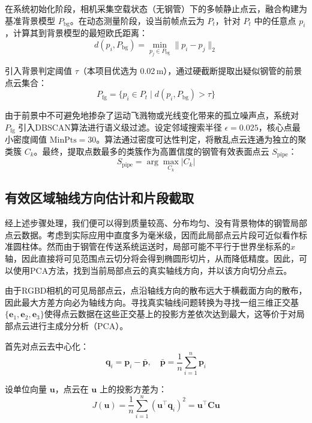 \documentclass{article}
\let\oldcite\cite
\renewcommand{\cite}[1]{\oldcite{#1}}
\begin{document}
在系统初始化阶段，相机采集空载状态（无钢管）下的多帧静止点云，融合构建为基准背景模型 $P_{\text{bg}}$。在动态测量阶段，设当前帧点云为 $P_t$，针对 $P_t$ 中的任意点 $p_i$，计算其到背景模型的最短欧氏距离：
\begin{equation}
    d(p_i, P_{\text{bg}}) = \min_{p_j \in P_{\text{bg}}} \| p_i - p_j \|_2
\end{equation}

引入背景判定阈值 $\tau$（本项目优选为 0.02\,m），通过硬截断提取出疑似钢管的前景点云集合：
\begin{equation}
    P_{\text{fg}} = \{ p_i \in P_t \mid d(p_i, P_{\text{bg}}) > \tau \}
\end{equation}

由于前景中不可避免地掺杂了运动飞溅物或光线变化带来的孤立噪声点，系统对 $P_{\text{fg}}$ 引入DBSCAN算法进行语义级过滤。设定邻域搜索半径 $\epsilon = 0.025$，核心点最小密度阈值 $\text{MinPts} = 30$。算法通过密度可达性判定，将散乱点云连通为独立的聚类簇 $C_k$。最终，提取点数最多的类簇作为高置信度的钢管有效表面点云 $S_{\text{pipe}}$：
\begin{equation}
    S_{\text{pipe}} = \arg\max_{C_k} |C_k|
\end{equation}

\subsection{有效区域轴线方向估计和片段截取}

经上述步骤处理，我们便可以得到质量较高、分布均匀、没有背景物体的钢管局部点云数据。考虑到实际应用中直度多为毫米级，因而此局部点云片段可近似看作标准圆柱体。然而由于钢管在传送系统运送时，局部可能不平行于世界坐标系的$x$轴，因此直接将可见范围点云切分将会得到椭圆形切片，从而降低精度。因此，可以使用PCA方法，找到当前局部点云的真实轴线方向，并以该方向切分点云。

由于RGBD相机的可见局部点云，点沿轴线方向的散布远大于横截面方向的散布，因此最大方差方向必为轴线方向。寻找真实轴线问题转换为寻找一组三维正交基$\{\mathbf{e}_1, \mathbf{e}_2, \mathbf{e}_3\}$使得点云数据在这些正交基上的投影方差依次达到最大，这等价于对局部点云进行主成分分析（PCA）\cite{pca}。

首先对点云去中心化：
\begin{equation}
    \mathbf{q}_i = \mathbf{p}_i - \bar{\mathbf{p}}, \quad \bar{\mathbf{p}} = \frac{1}{n} \sum_{i=1}^n \mathbf{p}_i
\end{equation}

设单位向量 $\mathbf{u}$，点云在 $\mathbf{u}$ 上的投影方差为：
\begin{equation}
    J(\mathbf{u}) = \frac{1}{n} \sum_{i=1}^n (\mathbf{u}^\top \mathbf{q}_i)^2
    = \mathbf{u}^\top \mathbf{C} \mathbf{u}
\end{equation}
\end{document}
